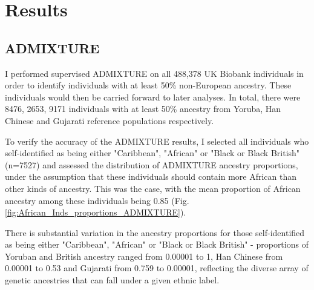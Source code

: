 \section{Results}

\subsection{ADMIXTURE}

I performed supervised ADMIXTURE on all 488,378 UK Biobank individuals in order to identify individuals with at least 50\% non-European ancestry. These individuals would then be carried forward to later analyses. In total, there were 8476, 2653, 9171 individuals with at least 50\% ancestry from Yoruba, Han Chinese and Gujarati reference populations respectively. 

To verify the accuracy of the ADMIXTURE results, I selected all individuals who self-identified as being either "Caribbean", "African" or "Black or Black British" (n=7527) and assessed the distribution of ADMIXTURE ancestry proportions, under the assumption that these individuals should contain more African than other kinds of ancestry. This was the case, with the mean proportion of African ancestry among these individuals being 0.85 (Fig. \ref{fig:African_Inds_proportions_ADMIXTURE}).

There is substantial variation in the ancestry proportions for those self-identified as being either "Caribbean", "African" or "Black or Black British" - proportions of Yoruban and British ancestry ranged from 0.00001 to 1, Han Chinese from 0.00001 to 0.53 and Gujarati from 0.759 to 0.00001, reflecting the diverse array of genetic ancestries that can fall under a given ethnic label. 


